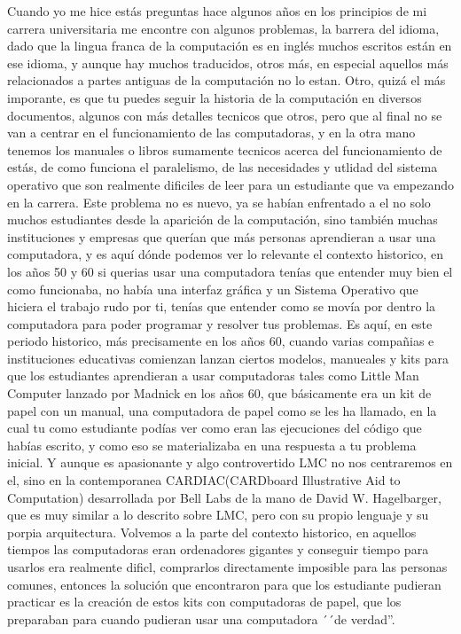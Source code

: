 \documentclass[letterpaper,12pt,oneside]{book}
\begin{document}
	Cuando yo me hice estás preguntas hace algunos años en los principios de mi carrera universitaria me encontre con algunos problemas, la barrera del idioma, dado
	que la lingua franca de la computación es en inglés muchos escritos están en ese idioma, y aunque hay muchos traducidos, otros más, en especial aquellos más 
	relacionados a partes antiguas de la computación no lo estan. Otro, quizá el más imporante, es que tu puedes seguir la historia de la computación en diversos 
	documentos, algunos	con más detalles tecnicos que otros, pero que al final no se van a centrar en el funcionamiento de las computadoras, y en la otra mano tenemos los 
	manuales
	o libros sumamente tecnicos acerca del funcionamiento de estás, de como funciona el paralelismo, de las necesidades y utlidad del sistema operativo que
	son realmente dificiles de leer para un estudiante que va empezando en la carrera. Este problema no es nuevo, ya se habían enfrentado a el no solo muchos
	estudiantes desde la aparición de la computación, sino también muchas instituciones y empresas que querían que más personas aprendieran a usar una computadora,
	y es aquí dónde podemos ver lo relevante el contexto historico, en los años 50 y 60 si querias usar una computadora tenías que entender muy bien el como funcionaba,
	no había una interfaz gráfica y un Sistema Operativo que hiciera el trabajo rudo por ti, tenías que entender como se movía por dentro la computadora para
	poder programar y resolver tus problemas. Es aquí, en este periodo historico, más precisamente en los años 60, cuando varias compañias e instituciones
	educativas comienzan lanzan ciertos modelos, manueales y kits para que los estudiantes aprendieran a usar computadoras tales como Little Man Computer lanzado por
	Madnick en los años 60, que básicamente era un kit de papel con un manual, una computadora de papel como se les ha llamado, en la cual tu como estudiante
	podías ver como eran las ejecuciones del código que habías escrito, y como eso se materializaba en una respuesta a tu problema inicial. Y aunque
	es apasionante y algo controvertido LMC no nos centraremos en el, sino en la contemporanea CARDIAC(CARDboard Illustrative Aid to Computation) desarrollada
	por Bell Labs de la mano de David W. Hagelbarger, que es
	muy similar a lo descrito sobre LMC, pero con su propio lenguaje y su porpia arquitectura. Volvemos a la parte del contexto historico, en aquellos tiempos
	las computadoras eran ordenadores gigantes y conseguir tiempo para usarlos era realmente dificl, comprarlos directamente imposible para las personas
	comunes, entonces la solución que encontraron para que los estudiante pudieran practicar es la creación de estos kits con computadoras de papel, que los
	preparaban  para cuando pudieran usar una computadora ´´de verdad''.
	
\end{document}
